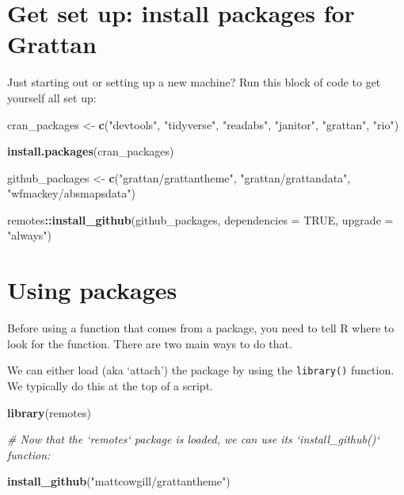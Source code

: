 \documentclass[]{book}
\newenvironment{Shaded}{\begin{snugshade}}{\end{snugshade}}
\newcommand{\CommentTok}[1]{\textcolor[rgb]{0.56,0.35,0.01}{\textit{#1}}}
\newcommand{\DataTypeTok}[1]{\textcolor[rgb]{0.13,0.29,0.53}{#1}}
\newcommand{\KeywordTok}[1]{\textcolor[rgb]{0.13,0.29,0.53}{\textbf{#1}}}
\newcommand{\NormalTok}[1]{#1}
\newcommand{\OperatorTok}[1]{\textcolor[rgb]{0.81,0.36,0.00}{\textbf{#1}}}
\newcommand{\OtherTok}[1]{\textcolor[rgb]{0.56,0.35,0.01}{#1}}
\newcommand{\StringTok}[1]{\textcolor[rgb]{0.31,0.60,0.02}{#1}}
\begin{document}
\hypertarget{get-set-up-install-packages-for-grattan}{%
\section{Get set up: install packages for Grattan}\label{get-set-up-install-packages-for-grattan}}

Just starting out or setting up a new machine? Run this block of code to get yourself all set up:

\begin{Shaded}
\begin{Highlighting}[]
\NormalTok{cran_packages <-}\StringTok{ }\KeywordTok{c}\NormalTok{(}\StringTok{"devtools"}\NormalTok{, }\StringTok{"tidyverse"}\NormalTok{, }\StringTok{"readabs"}\NormalTok{, }\StringTok{"janitor"}\NormalTok{, }\StringTok{"grattan"}\NormalTok{,}
                   \StringTok{"rio"}\NormalTok{)}

\KeywordTok{install.packages}\NormalTok{(cran_packages)}

\NormalTok{github_packages <-}\StringTok{ }\KeywordTok{c}\NormalTok{(}\StringTok{"grattan/grattantheme"}\NormalTok{, }\StringTok{"grattan/grattandata"}\NormalTok{,}
                     \StringTok{"wfmackey/absmapsdata"}\NormalTok{)}

\NormalTok{remotes}\OperatorTok{::}\KeywordTok{install_github}\NormalTok{(github_packages,}
                        \DataTypeTok{dependencies =} \OtherTok{TRUE}\NormalTok{,}
                        \DataTypeTok{upgrade =} \StringTok{"always"}\NormalTok{)}
\end{Highlighting}
\end{Shaded}

\hypertarget{using-packages}{%
\section{Using packages}\label{using-packages}}

Before using a function that comes from a package, you need to tell R where to look for the function. There are two main ways to do that.

We can either load (aka `attach') the package by using the \texttt{library()} function. We typically do this at the top of a script.

\begin{Shaded}
\begin{Highlighting}[]
\KeywordTok{library}\NormalTok{(remotes)}

\CommentTok{# Now that the `remotes` package is loaded, we can use its `install_github()` function:}

\KeywordTok{install_github}\NormalTok{(}\StringTok{"mattcowgill/grattantheme"}\NormalTok{)}
\end{Highlighting}
\end{Shaded}
\end{document}
